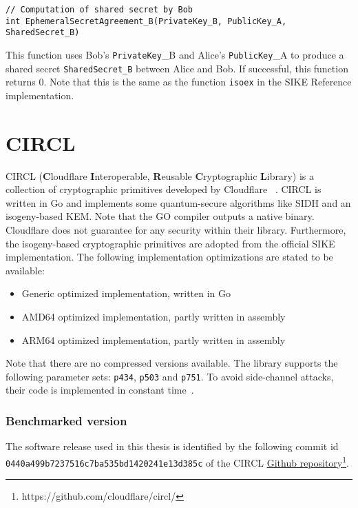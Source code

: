 \begin{lstlisting}[]
// Computation of shared secret by Bob
int EphemeralSecretAgreement_B(PrivateKey_B, PublicKey_A, SharedSecret_B)
\end{lstlisting}
This function uses Bob's \textcolor{keywordcol}{\texttt{PrivateKey}\_B} and Alice's \textcolor{keywordcol}{\texttt{PublicKey}\_A} to produce a shared secret \textcolor{keywordcol}{\texttt{SharedSecret\_B}} between Alice and Bob. If successful, this function returns 0. 
Note that this is the same as the function \texttt{isoex} in the SIKE Reference implementation.


\section{\gls{CIRCL}} \label{sec:circl_description}

\gls{CIRCL} (\textbf{C}loudflare \textbf{I}nteroperable, \textbf{R}eusable \textbf{C}ryptographic \textbf{L}ibrary) is a collection of cryptographic primitives developed by Cloudflare ~\parencite{circl2020github}. \gls{CIRCL} is written in Go and implements some quantum-secure algorithms like \gls{SIDH} and an isogeny-based \gls{KEM}. Note that the GO compiler outputs a native binary.  Cloudflare does not guarantee for any security within their library. Furthermore, the isogeny-based cryptographic primitives are adopted from the official \gls{SIKE} implementation. The following implementation optimizations are stated to be available:

\begin{itemize}
  \item Generic optimized implementation, written in Go 
  \item AMD64 optimized implementation, partly written in assembly
  \item ARM64 optimized implementation, partly written in assembly
\end{itemize}
Note that there are no compressed versions available. The library supports the following parameter sets: \texttt{p434}, \texttt{p503} and \texttt{p751}. To avoid side-channel attacks, their code is implemented in constant time~\parencite{circl2019intro}.

\subsubsection{Benchmarked version}
The software release used in this thesis is identified by the following commit id \\ \texttt{0440a499b7237516c7ba535bd1420241e13d385c} of the \gls{CIRCL} \href{https://github.com/cloudflare/circl/}{Github repository}\footnote{https://github.com/cloudflare/circl/}.

